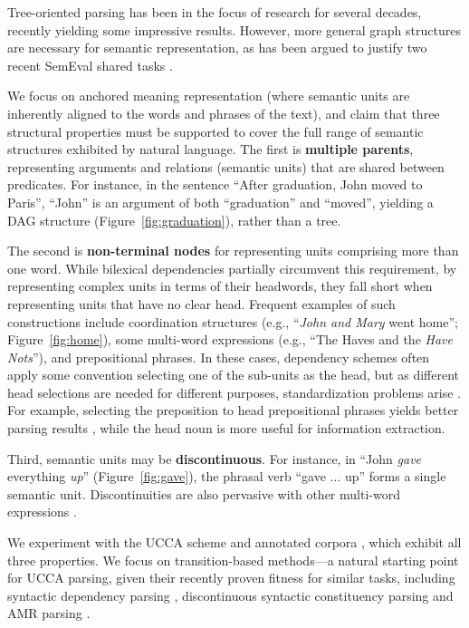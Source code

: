 \documentclass[11pt]{article}
\newcommand{\secref}[1]{Section~\ref{#1}}
\newcommand{\figref}[1]{Figure~\ref{#1}}
\begin{document}
Tree-oriented parsing has been in the focus of research for several decades,
recently yielding some impressive results.
However, more general graph structures are necessary for semantic representation,
as has been argued to justify two recent SemEval shared tasks
\cite[see \secref{sec:related_work}]{oepen2014semeval,oepen2015semeval}.

We focus on anchored meaning representation
(where semantic units are inherently aligned to the words and phrases of the text),
and claim that three structural properties must be supported to cover the full range of semantic
structures exhibited by natural language.
The first is \textbf{multiple parents},
representing arguments and relations (semantic units) that are shared between predicates.
For instance, in the sentence
``After graduation, John moved to Paris'', ``John'' is an argument of both ``graduation''
and ``moved'', yielding a DAG structure (\figref{fig:graduation}), rather than a tree.

The second is \textbf{non-terminal nodes} for representing units
comprising more than one word.
While bilexical dependencies partially circumvent this requirement, by
representing complex units in terms of their headwords, they fall short
when representing units that have no clear head.
Frequent examples of such constructions include
coordination structures (e.g., ``\textit{John and Mary} went home''; \figref{fig:home}),
some multi-word expressions (e.g., ``The Haves and the \textit{Have Nots}''),
and prepositional phrases.
In these cases, dependency schemes often apply some convention selecting one of the sub-units
as the head, but as different head selections are needed for different purposes,
standardization problems arise \cite{Ivanova2012who}.
For example, selecting the preposition to head prepositional phrases yields better
parsing results \cite{Schwartz:12}, while the head noun is more useful for
information extraction.

Third, semantic units may be \textbf{discontinuous}. For instance, in
``John \textit{gave} everything \textit{up}''
(\figref{fig:gave}), the phrasal verb ``gave ... up'' forms a single semantic unit.
Discontinuities are also pervasive with other multi-word
expressions \cite{schneider2014discriminative}.

We experiment with the UCCA scheme and annotated corpora
\cite[see \secref{sec:ucca}]{abend2013universal},
which exhibit all three properties.
We focus on transition-based methods---a natural starting point for UCCA parsing,
given their recently proven fitness for similar tasks, including syntactic dependency parsing
\cite{dyer2015transition,andor2016globally,kiperwasser2016simple},
discontinuous syntactic constituency parsing
\cite{maier-lichte:2016:DiscoNLP} and AMR parsing
\cite{wang-EtAl:2016:SemEval}.
\end{document}
